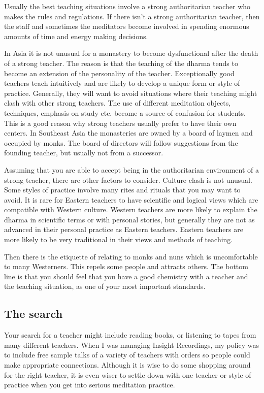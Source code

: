 \documentclass[a5paper,10pt,english]{book}
\begin{document}
\sphinxAtStartPar
Usually the best teaching situations involve a strong authoritarian
teacher who makes the rules and regulations. If there isn’t a strong
authoritarian teacher, then the staff and sometimes the meditators
become involved in spending enormous amounts of time and energy making
decisions.

\sphinxAtStartPar
In Asia it is not unusual for a monastery to become dysfunctional after
the death of a strong teacher. The reason is that the teaching of the
dharma tends to become an extension of the personality of the teacher.
Exceptionally good teachers teach intuitively and are likely to develop
a unique form or style of practice. Generally, they will want to avoid
situations where their teaching might clash with other strong teachers.
The use of different meditation objects, techniques, emphasis on study
etc. become a source of confusion for students. This is a good reason
why strong teachers usually prefer to have their own centers. In
Southeast Asia the monasteries are owned by a board of laymen and
occupied by monks. The board of directors will follow suggestions from
the founding teacher, but usually not from a successor.

\sphinxAtStartPar
Assuming that you are able to accept being in the authoritarian
environment of a strong teacher, there are other factors to consider.
Culture clash is not unusual. Some styles of practice involve many rites
and rituals that you may want to avoid. It is rare for Eastern teachers
to have scientific and logical views which are compatible with Western
culture. Western teachers are more likely to explain the dharma in
scientific terms or with personal stories, but generally they are not as
advanced in their personal practice as Eastern teachers. Eastern
teachers are more likely to be very traditional in their views and
methods of teaching.

\sphinxAtStartPar
Then there is the etiquette of relating to monks and nuns which is
uncomfortable to many Westerners. This repels some people and attracts
others. The bottom line is that you should feel that you have a good
chemistry with a teacher and the teaching situation, as one of your most
important standards.


\subsection{The search}
\label{\detokenize{saints:the-search}}
\sphinxAtStartPar
Your search for a teacher might include reading books, or listening to
tapes from many different teachers. When I was managing Insight
Recordings, my policy was to include free sample talks of a variety of
teachers with orders so people could make appropriate connections.
Although it is wise to do some shopping around for the right teacher, it
is even wiser to settle down with one teacher or style of practice when
you get into serious meditation practice.
\end{document}

